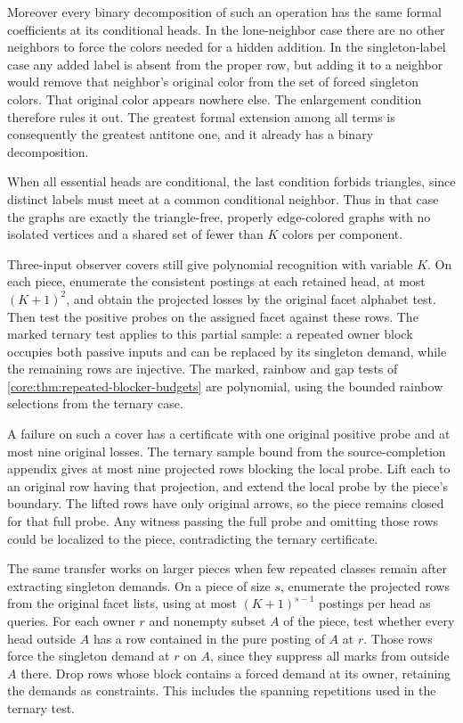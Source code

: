 Moreover every binary decomposition of such
an operation has the same formal coefficients
at its conditional heads. In the lone-neighbor
case there are no other neighbors to force
the colors needed for a hidden addition.
In the singleton-label case any added label
is absent from the proper row, but adding it
to a neighbor would remove that neighbor's
original color from the set of forced singleton
colors. That original color appears nowhere
else. The enlargement condition therefore
rules it out. The greatest formal extension
among all terms is consequently the greatest
antitone one, and it already has a binary
decomposition.

When all essential heads are conditional,
the last condition forbids triangles, since
distinct labels must meet at a common
conditional neighbor. Thus in that case
the graphs are exactly the triangle-free,
properly edge-colored graphs with no
isolated vertices and a shared set of
fewer than $K$ colors per component.

Three-input observer covers still give polynomial
recognition with variable $K$. On each piece,
enumerate the consistent postings at each
retained head, at most $(K+1)^2$, and obtain
the projected losses by the original facet
alphabet test. Then test the positive probes
on the assigned facet against these rows.
The marked ternary test applies to this
partial sample: a repeated owner block
occupies both passive inputs and can be
replaced by its singleton demand, while
the remaining rows are injective. The
marked, rainbow and gap tests of
\cref{core:thm:repeated-blocker-budgets}
are polynomial, using the bounded rainbow
selections from the ternary case.

A failure on such a cover has a certificate
with one original positive probe and at
most nine original losses. The ternary
sample bound from the source-completion
appendix gives at most nine projected rows
blocking the local probe. Lift each to an
original row having that projection, and
extend the local probe by the piece's
boundary. The lifted rows have only
original arrows, so the piece remains
closed for that full probe. Any witness
passing the full probe and omitting those
rows could be localized to the piece,
contradicting the ternary certificate.

The same transfer works on larger pieces when
few repeated classes remain after extracting
singleton demands. On a piece of size $s$,
enumerate the projected rows from the original
facet lists, using at most $(K+1)^{s-1}$
postings per head as queries. For each owner
$r$ and nonempty subset $A$ of the piece,
test whether every head outside $A$ has a
row contained in the pure posting of $A$
at $r$. Those rows force the singleton
demand at $r$ on $A$, since they suppress
all marks from outside $A$ there. Drop
rows whose block contains a forced demand
at its owner, retaining the demands as
constraints. This includes the spanning
repetitions used in the ternary test.

